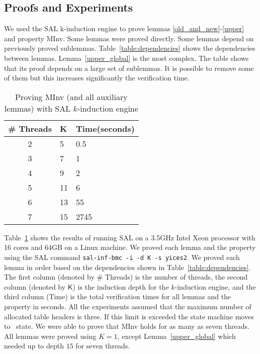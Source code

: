 \subsection{Proofs and Experiments}

We used the SAL k-induction engine to prove lemmas
\ref{old_and_new}-\ref{upper} and property \textsf{MInv}. Some lemmas
were proved directly. Some lemmas depend on previously proved
sublemmas. Table~\ref{table:dependencies} shows the dependencies
between lemmas. Lemma~\ref{upper_global} is the most complex. The
table shows that its proof depends on a large set of sublemmas. It is
possible to remove some of them but this increases significantly the 
verification time.

\begin{table}[t]
  \begin{center}
    \begin{tabular}{|c|l|l|}
      \hline
      \textsf{\# Threads} & \textsf{K} & \textsf{Time(seconds)} \\
      \hline
      \hline           
      2 & 5  & 0.5\\
      \hline           
      3 & 7  & 1 \\
      \hline           
      4 & 9  & 2\\
      \hline           
      5 & 11 & 6 \\
      \hline           
      6 & 13 & 55 \\
      \hline           
      7 & 15 & 2745 \\      
      \hline 
    \end{tabular}
    \caption{Proving \textsf{MInv} (and all auxiliary lemmas) with SAL $k$-induction engine}
    \label{sal-results}
    \end{center}
\end{table}


Table~\ref{sal-results} shows the results of running SAL on a 3.5GHz
Intel Xeon processor with 16 cores and 64GB on a Linux machine. We
proved each lemma and the property using the SAL command
\texttt{sal-inf-bmc -i -d \textsf{K} -s yices2}. We proved each lemma in
order based on the dependencies shown in
Table~\ref{table:dependencies}.
%
The first column (denoted by \textsf{\# Threads}) is the number of
threads, the second column (denoted by $\mathsf{K}$) is the induction
depth for the $k$-induction engine, and the third column
(\textsf{Time}) is the total verification times for all lemmas
and the property in seconds. All the experiments assumed that the
maximum number of allocated table headers is three. If this limit is exceeded
the state machine moves to \pcthree\ state.
%
We were able to prove that \textsf{MInv} holds for as many as seven
threads. All lemmas were proved using $K=1$, except
Lemma~\ref{upper_global} which needed up to depth $15$ for seven
threads.
%




